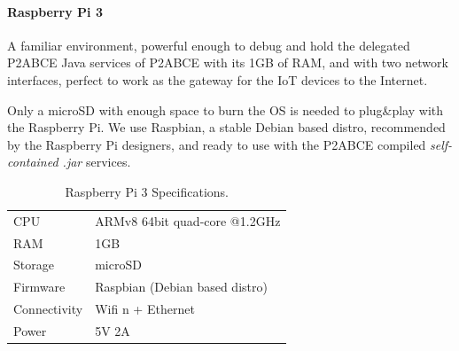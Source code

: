 \paragraph{Raspberry Pi 3} A familiar environment, powerful enough to debug and hold the delegated P2ABCE Java services of P2ABCE with its 1GB of RAM, and with two network interfaces, perfect to work as the gateway for the IoT devices to the Internet.

Only a microSD with enough space to burn the OS is needed to plug\&play with the Raspberry Pi. We use Raspbian, a stable Debian based distro, recommended by the Raspberry Pi designers, and ready to use with the P2ABCE compiled \textit{self-contained .jar} services.

\begin{table}[h]
	\myfloatalign
	\begin{tabularx}{0.75\textwidth}{ll} \toprule
		CPU & ARMv8 64bit quad-core @1.2GHz \\
		RAM & 1GB \\
		Storage & microSD \\
		Firmware & Raspbian (Debian based distro) \\
		Connectivity & Wifi n + Ethernet \\
		Power & 5V 2A \\
		\bottomrule
	\end{tabularx}
	\caption[Raspberry Pi 3 Specifications]{Raspberry Pi 3 Specifications.}
	\label{tab:RPi3Specs}
\end{table}



